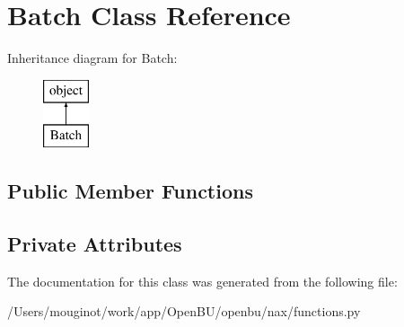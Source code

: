 \hypertarget{classopenbu_1_1nax_1_1functions_1_1_batch}{}\section{Batch Class Reference}
\label{classopenbu_1_1nax_1_1functions_1_1_batch}
Inheritance diagram for Batch\+:\begin{figure}[H]
\begin{center}
\leavevmode
\includegraphics[height=2.000000cm]{classopenbu_1_1nax_1_1functions_1_1_batch}
\end{center}
\end{figure}
\subsection*{Public Member Functions}
\subsection*{Private Attributes}


The documentation for this class was generated from the following file\+:\begin{DoxyCompactItemize}
\item 
/\+Users/mouginot/work/app/\+Open\+B\+U/openbu/nax/functions.\+py\end{DoxyCompactItemize}
